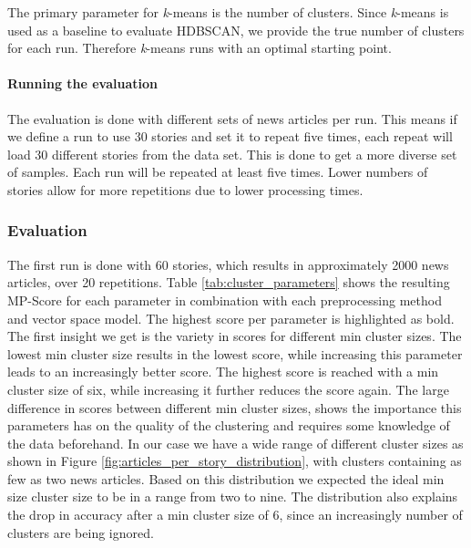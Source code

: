 The primary parameter for \textit{k}-means is the number of clusters. Since \textit{k}-means is used as a baseline to evaluate HDBSCAN, we provide the true number of clusters for each run. Therefore \textit{k}-means runs with an optimal starting point. 

\paragraph{Running the evaluation} The evaluation is done with different sets of news articles per run. This means if we define a run to use 30 stories and set it to repeat five times, each repeat will load 30 different stories from the data set. This is done to get a more diverse set of samples. Each run will be repeated at least five times. Lower numbers of stories allow for more repetitions due to lower processing times.   

\subsubsection{Evaluation}

The first run is done with 60 stories, which results in approximately 2000 news articles, over 20 repetitions. Table \ref{tab:cluster_parameters} shows the resulting MP-Score for each parameter in combination with each preprocessing method and vector space model. The highest score per parameter is highlighted as bold. The first insight we get  is the variety in scores for different min cluster sizes. The lowest min cluster size results in the lowest score, while increasing this parameter leads to an increasingly better score. The highest score is reached with a min cluster size of six, while increasing it further reduces the score again. The large difference in scores between different min cluster sizes, shows the importance this parameters has on the quality of the clustering and requires some knowledge of the data beforehand. In our case we have a wide range of different cluster sizes as shown in Figure \ref{fig:articles_per_story_distribution}, with clusters containing as few as two news articles. Based on this distribution we expected the ideal min size cluster size to be in a range from two to nine. The distribution also explains the drop in accuracy after a min cluster size of 6, since an increasingly number of clusters are being ignored.

